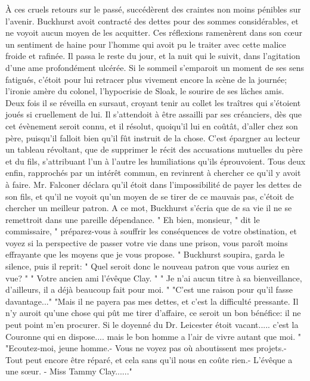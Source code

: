 À ces cruels retours sur le passé, succédèrent des craintes non moins pénibles sur l'avenir. Buckhurst avoit contracté des dettes pour des sommes considérables, et ne voyoit aucun moyen de les acquitter. Ces réflexions ramenèrent dans son cœur un sentiment de haine pour l'homme qui avoit pu le traiter avec cette malice froide et rafinée. Il passa le reste du jour, et la nuit qui le suivit, dans l'agitation d'une ame profondément ulcérée. Si le sommeil s'emparoit un moment de ses sens fatigués, c'étoit pour lui retracer plus vivement encore la scène de la journée; l'ironie amère du colonel, l'hypocrisie de Sloak, le sourire de ses lâches amis. Deux fois il se réveilla en sursaut, croyant tenir au collet les traîtres qui s'étoient joués si cruellement de lui.\setcounter{page}{413} Il s'attendoit à être assailli par ses créanciers, dès que cet évènement seroit connu, et il résolut, quoiqu'il lui en coûtât, d'aller chez son père, puisqu'il falloit bien qu'il fût instruit de la chose.
C'est épargner au lecteur un tableau révoltant, que de supprimer le récit des accusations mutuelles du père et du fils, s'attribuant l'un à l'autre les humiliations qu'ils éprouvoient. Tous deux enfin, rapprochés par un intérêt commun, en revinrent à chercher ce qu'il y avoit à faire. Mr. Falconer déclara qu'il étoit dans l'impossibilité de payer les dettes de son fils, et qu'il ne voyoit qu'un moyen de se tirer de ce mauvais pas, c'étoit de chercher un meilleur patron. A ce mot, Buckhurst s'écria que de sa vie il ne se remettroit dans une pareille dépendance.
" Eh bien, monsieur, " dit le commissaire, " préparez-vous à souffrir les conséquences de votre obstination, et voyez si la perspective de passer votre vie dans une prison, vous paroît moins effrayante que les moyens que je vous propose. "
Buckhurst soupira, garda le silence, puis il reprit: " Quel seroit donc le nouveau patron que vous auriez en vue? "
" Votre ancien ami l'évêque Clay. "
" Je n'ai aucun titre à sa bienveillance, d'ailleurs, il a déjà beaucoup fait pour moi. "\setcounter{page}{414} "C'est une raison pour qu'il fasse davantage..."
"Mais il ne payera pas mes dettes, et c'est la difficulté pressante. Il n'y auroit qu'une chose qui pût me tirer d'affaire, ce seroit un bon bénéfice: il ne peut point m'en procurer. Si le doyenné du Dr. Leicester étoit vacant..... c'est la Couronne qui en dispose.... mais le bon homme a l'air de vivre autant que moi. "
"Ecoutez-moi, jeune homme.- Vous ne voyez pas où aboutissent mes projets.- Tout peut encore être réparé, et cela sans qu'il nous en coûte rien.- L'évêque a une sœur. - Miss Tammy Clay......"
